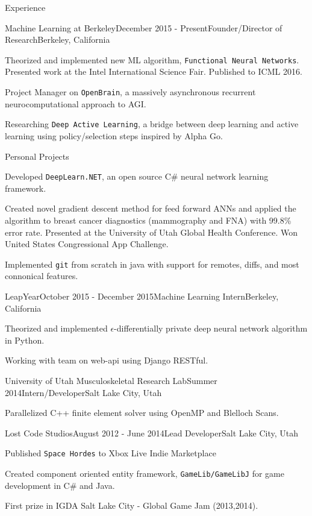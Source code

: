 \documentclass{resume} %
\begin{document}
\begin{rSection}{Experience}

\begin{rSubsection}{Machine Learning at Berkeley}{December 2015 - Present}{Founder/Director of Research}{Berkeley, California}
\item Theorized and implemented new ML algorithm, \texttt{Functional Neural Networks}. Presented work at the Intel International Science Fair. Published to ICML 2016.
\item Project Manager on \texttt{OpenBrain}, a massively asynchronous recurrent neurocomputational approach to AGI.
\item Researching \texttt{Deep Active Learning}, a bridge between deep learning and active learning using policy/selection steps inspired by Alpha Go.
\end{rSubsection}


\begin{rSubsection}{Personal Projects}{}{}{}
\item Developed \texttt{DeepLearn.NET}, an open source C\# neural network learning framework.
\item Created novel gradient descent method for feed forward ANNs and applied the algorithm to breast cancer diagnostics (mammography and FNA) with 99.8\% error rate. Presented at the University of Utah Global Health Conference. Won United States Congressional App Challenge.  
\item Implemented \texttt{git} from scratch in java with support for remotes, diffs, and most connonical features.
\end{rSubsection}
\begin{rSubsection}{LeapYear}{October 2015 - December 2015}{Machine Learning Intern}{Berkeley, California}
\item Theorized and implemented $\epsilon$-differentially private deep neural network algorithm in Python.
\item Working with team on web-api using Django RESTful.
\end{rSubsection}
\begin{rSubsection}{University of Utah Musculoskeletal Research Lab}{Summer 2014}{Intern/Developer}{Salt Lake City, Utah}
\item Parallelized C++ finite element solver using OpenMP and Blelloch Scans.
\end{rSubsection}

\begin{rSubsection}{Lost Code Studios}{August 2012 - June 2014}{Lead Developer}{Salt Lake City, Utah}
\item Published \texttt{Space Hordes} to Xbox Live Indie Marketplace
\item Created component oriented entity framework, \texttt{GameLib/GameLibJ} for game development in C\# and Java.
\item First prize in IGDA Salt Lake City - Global Game Jam (2013,2014).
\end{rSubsection}





\end{rSection}
\end{document}
